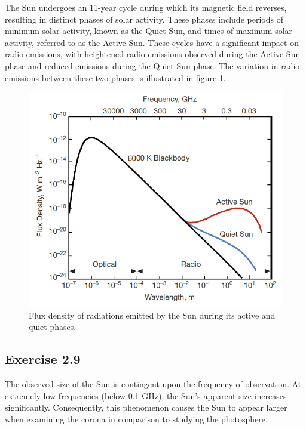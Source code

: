 \documentclass[12pt]{article}
\begin{document}
 The Sun undergoes an 11-year cycle during which its magnetic field reverses, resulting in distinct phases of solar activity. These phases include periods of minimum solar activity, known as the Quiet Sun, and times of maximum solar activity, referred to as the Active Sun. These cycles have a significant impact on radio emissions, with heightened radio emissions observed during the Active Sun phase and reduced emissions during the Quiet Sun phase. The variation in radio emissions between these two phases is illustrated in figure \ref{fig2.3}.

 \begin{figure}[H]
 \centering
 \includegraphics[scale=.5]{fig/sunRadioSpectrum.png}
 \caption{Flux density of radiations emitted by the Sun during its active and quiet phases.\parencite[Image credit][]{activequitesun}}
 \label{fig2.3}
 \end{figure}


 \subsection{Exercise 2.9}

 The observed size of the Sun is contingent upon the frequency of observation. At extremely low frequencies (below 0.1 GHz), the Sun's apparent size increases significantly. Consequently, this phenomenon causes the Sun to appear larger when examining the corona in comparison to studying the photosphere\parencite{sizeofsun}. 
\end{document}
